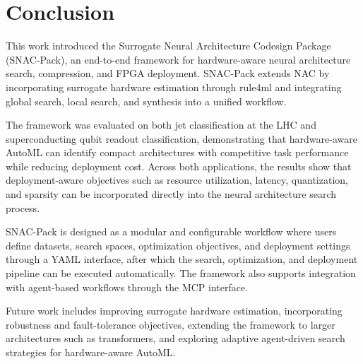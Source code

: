 \documentclass[11pt]{article}
\begin{document}

\section{Conclusion}

This work introduced the Surrogate Neural Architecture Codesign Package (SNAC-Pack), an end-to-end framework for hardware-aware neural architecture search, compression, and FPGA deployment. SNAC-Pack extends NAC by incorporating surrogate hardware estimation through rule4ml and integrating global search, local search, and synthesis into a unified workflow.

The framework was evaluated on both jet classification at the LHC and superconducting qubit readout classification, demonstrating that hardware-aware AutoML can identify compact architectures with competitive task performance while reducing deployment cost. Across both applications, the results show that deployment-aware objectives such as resource utilization, latency, quantization, and sparsity can be incorporated directly into the neural architecture search process.

SNAC-Pack is designed as a modular and configurable workflow where users define datasets, search spaces, optimization objectives, and deployment settings through a YAML interface, after which the search, optimization, and deployment pipeline can be executed automatically. The framework also supports integration with agent-based workflows through the MCP interface.

Future work includes improving surrogate hardware estimation, incorporating robustness and fault-tolerance objectives, extending the framework to larger architectures such as transformers, and exploring adaptive agent-driven search strategies for hardware-aware AutoML.


\end{document}
